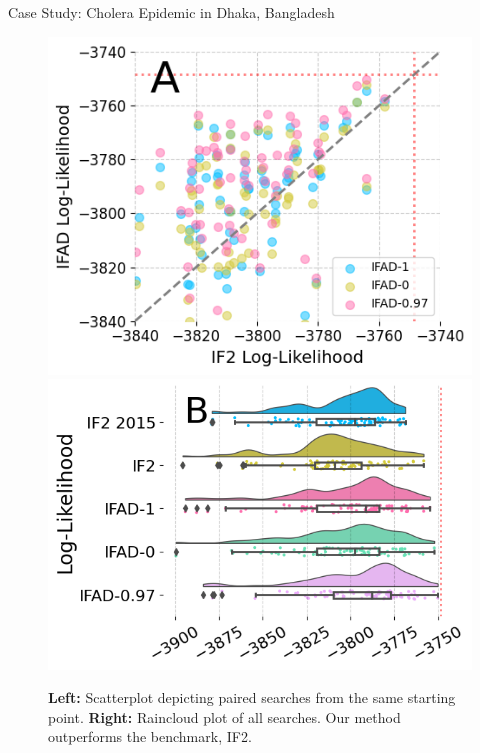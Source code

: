 \documentclass[final]{beamer}
\newlength{\colwidth}
\begin{document}
\begin{frame}[t]
\begin{columns}[t]
\begin{column}{\colwidth}
\begin{exampleblock}{Case Study: Cholera Epidemic in Dhaka, Bangladesh}
    \begin{figure}[H]
    \centering
    \includegraphics[scale=1.15]{imgs/095/pairs.png}
    \includegraphics[scale=0.915]{imgs/095/boxplot_all.png}
    \caption{\textbf{Left:} Scatterplot depicting paired searches from the same starting point. \textbf{Right:} Raincloud plot of all searches. Our method outperforms the benchmark, IF2. }
    \label{fig:scatter-raincloud}
\end{figure}


\end{exampleblock}
\end{column}
\end{columns}
\end{frame}
\end{document}
